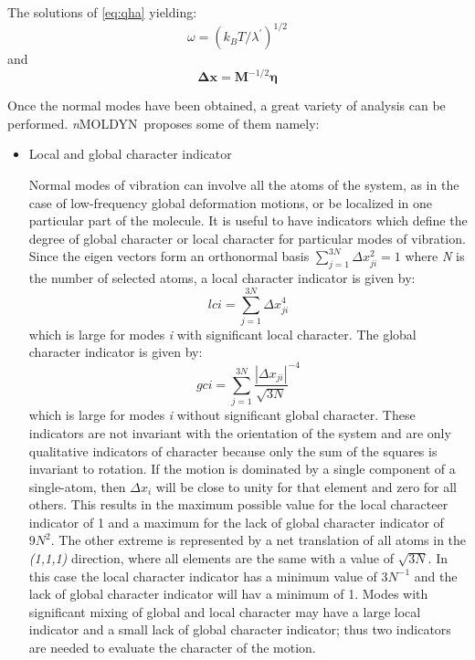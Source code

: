 \documentclass[a4paper,11pt]{report}
\newcommand{\NMOLDYN}{\textit{n}MOLDYN}
\begin{document}
The solutions of \ref{eq:qha} yielding:
\begin{equation}
\label{eq:qha_omega}
\omega = \left (k_{B}T/\lambda^{\prime} \right )^{1/2}
\end{equation}
and
\begin{equation}
\label{eq:qha_dx}
\mathbf{\Delta x} = \mathbf{M}^{-1/2}\mathbf{\eta}
\end{equation}

Once the normal modes have been obtained, a great variety of analysis can be performed. \NMOLDYN\ proposes some of 
them namely:
\begin{itemize}
\item Local and global character indicator

Normal modes of vibration can involve all the atoms of the system, as in the case of low-frequency global deformation motions, or 
be localized in one particular part of the molecule. It is useful to have indicators which define the degree of global character or local 
character for particular modes of vibration. Since the eigen vectors form an orthonormal basis 
$\sum_{j = 1}^{3N} \Delta x_{ji}^2 = 1$ where \textit{N} is the number of selected atoms, a local character indicator is given by:
\begin{equation}
\label{eq:qha_lci}
lci = \sum_{j = 1}^{3N} \Delta x_{ji}^4
\end{equation}
which is large for modes \textit{i} with significant local character. The global character indicator is given by:
\begin{equation}
\label{eq:qha_gci}
gci = \sum_{j = 1}^{3N} \frac{|\Delta x_{ji}|}{\sqrt{3N}}^{-4}
\end{equation}
which is large for modes \textit{i} without significant global character. These indicators are not invariant with the orientation of the 
system and are only qualitative indicators of character because only the sum of the squares is invariant to rotation. If the motion is 
dominated by a single component of a single-atom, then $\Delta x_i$ will be close to unity for that element and zero for all others. This
results in the maximum possible value for the local characteer indicator of 1 and a maximum for the lack of global character 
indicator of $9N^2$. The other extreme is represented by a net translation of all atoms in the \textit{(1,1,1)} direction, where all elements are the 
same with a value of $\sqrt{3N}$. In this case the local character indicator has a minimum value of $3N^{-1}$ and the lack of global character 
indicator will hav a minimum of 1. Modes with significant mixing of global and local character may have a large local indicator and a small lack of global 
character indicator; thus two indicators are needed to evaluate the character of the motion.


\end{itemize}
\end{document}
